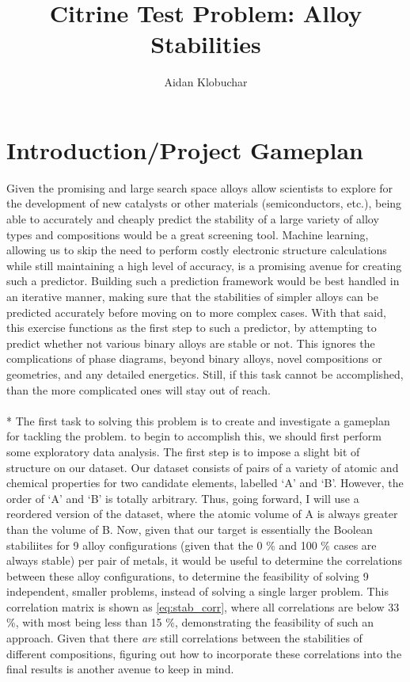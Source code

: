 \documentclass[11pt]{article}
\title{Citrine Test Problem: Alloy Stabilities}
\author{Aidan Klobuchar}
\date{}
\begin{document}
\maketitle
\section{Introduction/Project Gameplan}
\noindent
Given the promising and large search space alloys allow scientists to explore for the development of new catalysts or other materials (semiconductors, etc.), being able to accurately and cheaply predict the stability of a large variety of alloy types and compositions would be a great screening tool. Machine learning, allowing us to skip the need to perform costly electronic structure calculations while still maintaining a high level of accuracy, is a promising avenue for creating such a predictor. Building such a prediction framework would be best handled in an iterative manner, making sure that the stabilities of simpler alloys can be predicted accurately before moving on to more complex cases. With that said, this exercise functions as the first step to such a predictor, by attempting to predict whether not various binary alloys are stable or not. This ignores the complications of phase diagrams, beyond binary alloys, novel compositions or geometries, and any detailed energetics. Still, if this task cannot be accomplished, than the more complicated ones will stay out of reach. 
\\
\\*
The first task to solving this problem is to create and investigate a gameplan for tackling the problem. to begin to accomplish this, we should first perform some exploratory data analysis. The first step is to impose a slight bit of structure on our dataset. Our dataset consists of pairs of a variety of atomic and chemical properties for two candidate elements, labelled `A' and `B'. However, the order of `A' and `B' is totally arbitrary. Thus, going forward, I will use a reordered version of the dataset, where the atomic volume of A is always greater than the volume of B. Now, given that our target is essentially the Boolean stabiliites for 9 alloy configurations (given that the 0 \% and 100 \% cases are always stable) per pair of metals, it would be useful to determine the correlations between these alloy configurations, to determine the feasibility of solving 9 independent, smaller problems, instead of solving a single larger problem. This correlation matrix is shown as \eqref{eq:stab_corr}, where all correlations are below 33 \%, with most being less than 15 \%, demonstrating the feasibility of such an approach. Given that there \emph{are} still correlations between the stabilities of different compositions, figuring out how to incorporate these correlations into the final results is another avenue to keep in mind. 
\end{document}
